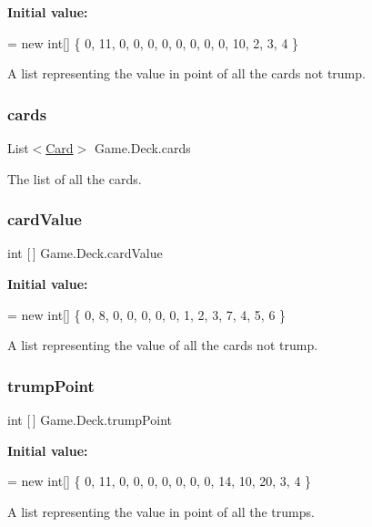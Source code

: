 {\bfseries Initial value\+:}
\begin{DoxyCode}
= \textcolor{keyword}{new} \textcolor{keywordtype}{int}[]
        \{
            0, 11, 0, 0, 0, 0, 0, 0, 0, 0, 10, 2, 3, 4
        \}
\end{DoxyCode}
A list representing the value in point of all the cards not trump. \mbox{\label{class_game_1_1_deck_ab0baedb618b1ef893fa4ae9ce063748e}} 
\subsubsection{\texorpdfstring{cards}{cards}}
{\footnotesize\ttfamily List$<$\hyperlink{class_game_1_1_card}{Card}$>$ Game.\+Deck.\+cards}

The list of all the cards. \mbox{\label{class_game_1_1_deck_a65e61cbf0d765d09c6d0742792ec0d82}} 
\subsubsection{\texorpdfstring{card\+Value}{cardValue}}
{\footnotesize\ttfamily int \mbox{[}$\,$\mbox{]} Game.\+Deck.\+card\+Value}

{\bfseries Initial value\+:}
\begin{DoxyCode}
= \textcolor{keyword}{new} \textcolor{keywordtype}{int}[]
        \{
            0, 8, 0, 0, 0, 0, 0, 1, 2, 3, 7, 4, 5, 6
        \}
\end{DoxyCode}
A list representing the value of all the cards not trump. \mbox{\label{class_game_1_1_deck_a88e31656c1599ddbe6bfb62b2ca34442}} 
\subsubsection{\texorpdfstring{trump\+Point}{trumpPoint}}
{\footnotesize\ttfamily int \mbox{[}$\,$\mbox{]} Game.\+Deck.\+trump\+Point}

{\bfseries Initial value\+:}
\begin{DoxyCode}
= \textcolor{keyword}{new} \textcolor{keywordtype}{int}[]
        \{
            0, 11, 0, 0, 0, 0, 0, 0, 0, 14, 10, 20, 3, 4
        \}
\end{DoxyCode}
A list representing the value in point of all the trumps. \mbox{\label{class_game_1_1_deck_a1f9866a01494d663c631d26f5bb8aa59}} 
